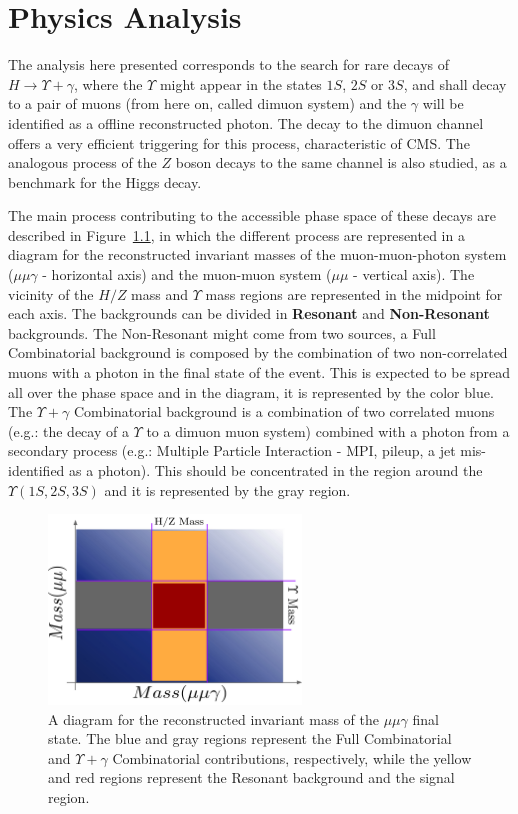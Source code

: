 \chapter{Physics Analysis}

The analysis here presented corresponds to the search for rare decays of $H \rightarrow \Upsilon + \gamma$, where the $\Upsilon$ might appear in the states $1S$, $2S$ or $3S$, and shall decay to a pair of muons (from here on, called dimuon system) and the $\gamma$ will be identified as a offline reconstructed photon. The decay to the dimuon channel offers a very efficient triggering for this process, characteristic of CMS. The analogous process of the $Z$ boson decays to the same channel is also studied, as a benchmark for the Higgs decay.

The main process contributing to the accessible phase space of these decays are described in Figure~\ref{analysis_process_diagram}, in which the different process are represented in a diagram for the reconstructed invariant masses of the muon-muon-photon system ($\mu\mu\gamma$ - horizontal axis) and the muon-muon system ($\mu\mu$ - vertical axis). The vicinity of the $H/Z$ mass and $\Upsilon$ mass regions are represented in the midpoint for each axis. The backgrounds can be divided in \textbf{Resonant} and \textbf{Non-Resonant} backgrounds. The Non-Resonant might come from two sources, a Full Combinatorial background is composed by the combination of two non-correlated muons with a photon in the final state of the event. This is expected to be spread all over the phase space and in the diagram, it is represented by the color blue. The $\Upsilon+ \gamma$ Combinatorial background is a combination of two correlated muons (e.g.: the decay of a $\Upsilon$ to a dimuon muon system) combined with a photon from a secondary process (e.g.: Multiple Particle Interaction - MPI, pileup, a jet mis-identified as a photon). This should be concentrated in the region around the $\Upsilon(1S, 2S, 3S)$ and it is represented by the gray region.

\begin{figure}[htbp]
    \centering
    \includegraphics[width=0.6\textwidth]{figures_and_tables/analysis_process.pdf}
    \caption{A diagram for the reconstructed invariant mass of the $\mu\mu\gamma$ final state. The blue and gray regions represent the Full Combinatorial and $\Upsilon + \gamma$ Combinatorial contributions, respectively, while the yellow and red regions represent the Resonant background and the signal region.}
    \label{analysis_process_diagram}
\end{figure}

